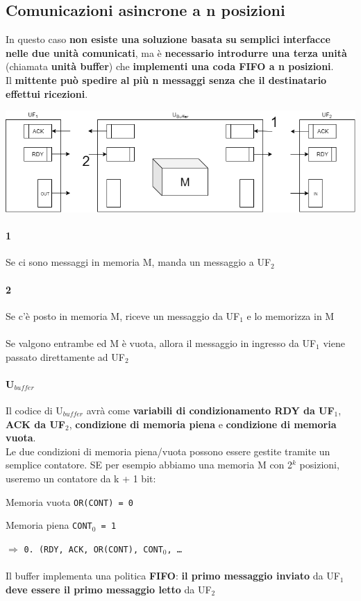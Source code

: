 \documentclass[10pt]{report}
\begin{document}
\subsection{Comunicazioni asincrone a n posizioni}
In questo caso \textbf{non esiste una soluzione basata su semplici interfacce nelle due unità comunicati}, ma è \textbf{necessario introdurre una terza unità} (chiamata \textbf{unità buffer}) che \textbf{implementi una coda FIFO a n posizioni}.\\
Il \textbf{mittente può spedire al più n messaggi senza che il destinatario effettui ricezioni}.
\begin{center}
\includegraphics[scale=0.7]{asynnpos.png}
\end{center}
\paragraph{1} Se ci sono messaggi in memoria M, manda un messaggio a UF$_2$
\paragraph{2} Se c'è posto in memoria M, riceve un messaggio da UF$_1$ e lo memorizza in M
\paragraph{} Se valgono entrambe ed M è vuota, allora il messaggio in ingresso da UF$_1$ viene passato direttamente ad UF$_2$
\paragraph{U$_{buffer}$} Il codice di U$_{buffer}$ avrà come \textbf{variabili di condizionamento RDY da UF$_1$}, \textbf{ACK da UF$_2$}, \textbf{condizione di memoria piena} e \textbf{condizione di memoria vuota}.\\
Le due condizioni di memoria piena/vuota possono essere gestite tramite un semplice contatore. SE per esempio abbiamo una memoria M con 2$^k$ posizioni, useremo un contatore da k + 1 bit:
\begin{list}{}{}
	\item Memoria vuota \texttt{OR(CONT) = 0}
	\item Memoria piena \texttt{CONT$_0$ = 1}
\end{list}
$\Rightarrow$ \texttt{0. (RDY, ACK, OR(CONT), CONT$_0$, \ldots}\\\\
Il buffer implementa una politica \textbf{FIFO}: \textbf{il primo messaggio inviato} da UF$_1$ \textbf{deve essere il primo messaggio letto} da UF$_2$
\end{document}
